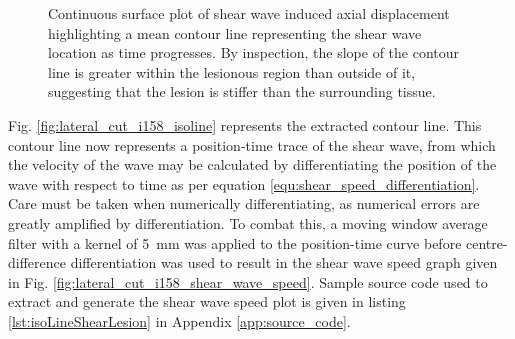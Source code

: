 			\begin{figure}[!htb]
				\centering
				\caption[Sample continuous surface plot of shear wave induced axial displacement highlighting the shear wave location in time]{Continuous surface plot of shear wave induced axial displacement highlighting a mean contour line representing the shear wave location as time progresses. By inspection, the slope of the contour line is greater within the lesionous region than outside of it, suggesting that the lesion is stiffer than the surrounding tissue.}
				\label{fig:lateral_cut_i158_imgsc_isoline}
			\end{figure}

			Fig. \ref{fig:lateral_cut_i158_isoline} represents the extracted contour line. This contour line now represents a position-time trace of the shear wave, from which the velocity of the wave may be calculated by differentiating the position of the wave with respect to time as per equation \ref{equ:shear_speed_differentiation}. Care must be taken when numerically differentiating, as numerical errors are greatly amplified by differentiation. To combat this, a moving window average filter with a kernel of \SI{5}{\mm} was applied to the position-time curve before centre-difference differentiation was used to result in the shear wave speed graph given in Fig. \ref{fig:lateral_cut_i158_shear_wave_speed}. Sample source code used to extract and generate the shear wave speed plot is given in listing \ref{lst:isoLineShearLesion} in Appendix \ref{app:source_code}.


